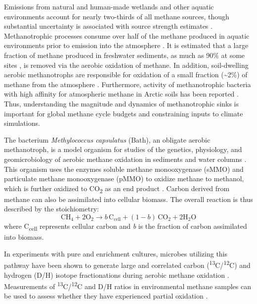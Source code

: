 Emissions from natural and human-made wetlands and other aquatic
environments account for nearly two-thirds of all methane sources,
though substantial uncertainty is associated with source strength
estimates \parencite{Kirschke++_2013_NG}. Methanotrophic processes consume over
half of the methane produced in aquatic environments prior to emission
into the atmosphere \parencite{Reeburgh_2007_CR}. It is estimated that a large
fraction of methane produced in freshwater sediments, as much as 90\% at
some sites \parencite{Oremland+Culbertson_1992_N}, is removed via the aerobic
oxidation of methane. In addition, soil-dwelling aerobic methanotrophs
are responsible for oxidation of a small fraction (\textasciitilde{}2\%)
of methane from the atmosphere \parencite{Kirschke++_2013_NG}. Furthermore,
activity of methanotrophic bacteria with high affinity for atmospheric
methane in Arctic soils has been reported \parencite{Lau++_2015_ISMEJ}. Thus,
understanding the magnitude and dynamics of methanotrophic sinks is
important for global methane cycle budgets and constraining inputs to
climate simulations.

The bacterium \emph{Methylococcus capsulatus} (Bath), an obligate
aerobic methanotroph, is a model organism for studies of the genetics,
physiology, and geomicrobiology of aerobic methane oxidation in
sediments and water columns \parencite{Whittenbury++_1970_JGM,Bowman_2014}.
This organism uses the enzymes soluble methane monooxygenase (sMMO) and
particulate methane monooxygenase (pMMO) to oxidize methane to methanol,
which is further oxidized to CO\textsubscript{2} as an end product
\parencite{Hanson+Hanson_1996_MMBR}. Carbon derived from methane can also be
assimilated into cellular biomass. The overall reaction is thus
described by the stoichiometry:
\begin{equation}\label{eqn:4:1}
{\text{CH}}_4+2{\text{O}}_2 \longrightarrow b\,{\text{C}}_\text{cell}+(1-b)\,{\text{CO}}_2+2{\text{H}}_2\text{O}
\end{equation}
where C\textsubscript{cell} represents cellular carbon and \emph{b} is
the fraction of carbon assimilated into biomass.

In experiments with pure and enrichment cultures, microbes utilizing
this pathway have been shown to generate large and correlated carbon
(\textsuperscript{13}C/\textsuperscript{12}C) and hydrogen (D/H) isotope
fractionations during aerobic methane oxidation \parencite{Coleman++_1981_GCA,Kinnaman++_2007_GCA,Powelson++_2007_EST,Feisthauer++_2011_GCA}.
Measurements of \textsuperscript{13}C/\textsuperscript{12}C and D/H
ratios in environmental methane samples can be used to assess whether
they have experienced partial oxidation \parencite{Hornibrook++_1997_GCA,Chanton++_2005}.


